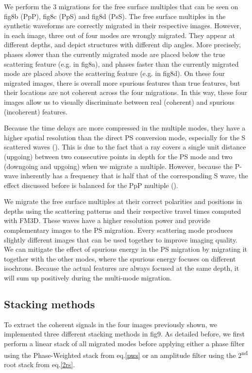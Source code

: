 \documentclass[9pt,a4paper]{article}
\numberwithin{equation}{section}
\begin{document}
\begin{multicols}{2}
We perform the 3 migrations for the free surface multiples that can be seen on fig8b (PpP), fig8c (PpS) and fig8d (PsS).
The free surface multiples in the synthetic waveforms are correctly migrated in their respective images.
However, in each image, three out of four modes are wrongly migrated. 
They appear at different depths, and depict structures with different dip angles.
More precisely, phases slower than the currently migrated mode are placed below the true scattering feature (e.g. in fig8a), and phases faster than the currently migrated mode are placed above the scattering feature (e.g. in fig8d).
On these four migrated images, there is overall more spurious features than true features, but their locations are not coherent across the four migrations.
In this way, these four images allow us to visually discriminate between real (coherent) and spurious (incoherent) features.

Because the time delays are more compressed in the multiple modes, they have a higher spatial resolution than the direct PS conversion mode, especially for the S scattered waves (\cite{rond_sgeo_09}).
This is due to the fact that a ray covers a single unit distance (upgoing) between two consecutive points in depth for the PS mode and two (downgoing and upgoing) when we migrate a multiple.
However, because the P-wave inherently has a frequency that is half that of the corresponding S wave, the effect discussed before is balanced for the PpP multiple (\cite{rond_sgeo_09}).

We migrate the free surface multiples at their correct polarities and positions in depths using the scattering patterns and their respective travel times computed with FM3D.
These waves have a higher resolution power and provide complementary images to the PS migration.
Every scattering mode produces slightly different images that can be used together to improve imaging quality.
We can mitigate the effect of spurious energy in the PS migration by migrating it together with the other modes, where the spurious energy focuses on different isochrons.
Because the actual features are always focused at the same depth, it will sum up positively during the multi-mode migration.

\subsection{Stacking methods}

To extract the coherent signals in the four images previously shown, we implemented three different stacking methods in fig9.
As detailed before, we first perform a linear stack of all migrated modes before applying either a phase filter using the Phase-Weighted stack from eq.\eqref{pws} or an amplitude filter using the 2\textsuperscript{nd} root stack from eq.\eqref{2rs}.


\end{multicols}
\end{document}
